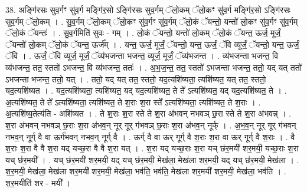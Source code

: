 \documentclass[17pt]{extarticle}
\begin{document}
38. अङ्गि॑रसः सुव॒र्गꣳ सु॑व॒र्ग मङ्गि॑र॒सो ऽङ्गि॑रसः सुव॒र्गम् ॅलो॒कम् ॅलो॒कꣳ सु॑व॒र्ग मङ्गि॑र॒सो ऽङ्गि॑रसः सुव॒र्गम् ॅलो॒कम् । . सु॒व॒र्गम् ॅलो॒कम् ॅलो॒कꣳ सु॑व॒र्गꣳ सु॑व॒र्गम् ॅलो॒कं ॅयन्तो॒ यन्तो॑ लो॒कꣳ सु॑व॒र्गꣳ सु॑व॒र्गम् ॅलो॒कं ॅयन्तः॑ । . सु॒व॒र्गमिति॑ सुवः - गम् । . लो॒कं ॅयन्तो॒ यन्तो॑ लो॒कम् ॅलो॒कं ॅयन्त॒ ऊर्ज॒ मूर्जं॒ ॅयन्तो॑ लो॒कम् ॅलो॒कं ॅयन्त॒ ऊर्ज᳚म् । . यन्त॒ ऊर्ज॒ मूर्जं॒ ॅयन्तो॒ यन्त॒ ऊर्जं॒ ॅवि व्यूर्जं॒ ॅयन्तो॒ यन्त॒ ऊर्जं॒ ॅवि । . ऊर्जं॒ ॅवि व्यूर्ज॒ मूर्जं॒ ॅव्य॑भजन्ता भजन्त॒ व्यूर्ज॒ मूर्जं॒ ॅव्य॑भजन्त । . व्य॑भजन्ता भजन्त॒ वि व्य॑भजन्त॒ तत॒ स्ततो॑ ऽभजन्त॒ वि व्य॑भजन्त॒ ततः॑ । . अ॒भ॒ज॒न्त॒ तत॒ स्ततो॑ ऽभजन्ता भजन्त॒ ततो॒ यद् यत् ततो॑ ऽभजन्ता भजन्त॒ ततो॒ यत् । . ततो॒ यद् यत् तत॒ स्ततो॒ यद॒त्यशि॑ष्यता॒ त्यशि॑ष्यत॒ यत् तत॒ स्ततो॒ यद॒त्यशि॑ष्यत । . यद॒त्यशि॑ष्यता॒ त्यशि॑ष्यत॒ यद् यद॒त्यशि॑ष्यत॒ ते ते᳚ ऽत्यशि॑ष्यत॒ यद् यद॒त्यशि॑ष्यत॒ ते । . अ॒त्यशि॑ष्यत॒ ते ते᳚ ऽत्यशि॑ष्यता॒ त्यशि॑ष्यत॒ ते श॒राः श॒रा स्ते᳚ ऽत्यशि॑ष्यता॒ त्यशि॑ष्यत॒ ते श॒राः । . अ॒त्यशि॑ष्य॒तेत्य॑ति - अशि॑ष्यत । . ते श॒राः श॒रा स्ते ते श॒रा अ॑भवन् नभवञ् छ॒रा स्ते ते श॒रा अ॑भवन्न् । . श॒रा अ॑भवन् नभवञ् छ॒राः श॒रा अ॑भव॒न् नूर् गूर् ग॑भवञ् छ॒राः श॒रा अ॑भव॒न् नूर्क् । . अ॒भ॒व॒न् नूर् गूर् ग॑भवन् नभव॒न् नूर्ग् वै वा ऊर्ग॑भवन् नभव॒न् नूर्ग् वै । . ऊर्ग् वै वा ऊर् गूर्ग् वै श॒राः श॒रा वा ऊर् गूर्ग् वै श॒राः । . वै श॒राः श॒रा वै वै श॒रा यद् यच्छ॒रा वै वै श॒रा यत् । . श॒रा यद् यच्छ॒राः श॒रा यच् छ॑र॒मयी॑ शर॒मयी॒ यच्छ॒राः श॒रा यच् छ॑र॒मयी᳚ । . यच् छ॑र॒मयी॑ शर॒मयी॒ यद् यच् छ॑र॒मयी॒ मेख॑ला॒ मेख॑ला शर॒मयी॒ यद् यच् छ॑र॒मयी॒ मेख॑ला । . श॒र॒मयी॒ मेख॑ला॒ मेख॑ला शर॒मयी॑ शर॒मयी॒ मेख॑ला॒ भव॑ति॒ भव॑ति॒ मेख॑ला शर॒मयी॑ शर॒मयी॒ मेख॑ला॒ भव॑ति । . श॒र॒मयीति॑ शर - मयी᳚ । \newline
\pagebreak
{}
\end{document}
